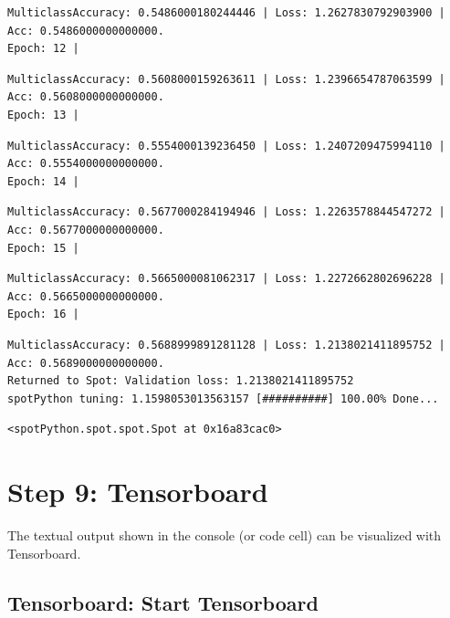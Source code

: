 \documentclass[
  letterpaper,
  DIV=11,
  numbers=noendperiod]{scrreprt}
\begin{document}
\begin{verbatim}
MulticlassAccuracy: 0.5486000180244446 | Loss: 1.2627830792903900 | Acc: 0.5486000000000000.
Epoch: 12 | 
\end{verbatim}

\begin{verbatim}
MulticlassAccuracy: 0.5608000159263611 | Loss: 1.2396654787063599 | Acc: 0.5608000000000000.
Epoch: 13 | 
\end{verbatim}

\begin{verbatim}
MulticlassAccuracy: 0.5554000139236450 | Loss: 1.2407209475994110 | Acc: 0.5554000000000000.
Epoch: 14 | 
\end{verbatim}

\begin{verbatim}
MulticlassAccuracy: 0.5677000284194946 | Loss: 1.2263578844547272 | Acc: 0.5677000000000000.
Epoch: 15 | 
\end{verbatim}

\begin{verbatim}
MulticlassAccuracy: 0.5665000081062317 | Loss: 1.2272662802696228 | Acc: 0.5665000000000000.
Epoch: 16 | 
\end{verbatim}

\begin{verbatim}
MulticlassAccuracy: 0.5688999891281128 | Loss: 1.2138021411895752 | Acc: 0.5689000000000000.
Returned to Spot: Validation loss: 1.2138021411895752
spotPython tuning: 1.1598053013563157 [##########] 100.00% Done...
\end{verbatim}

\begin{verbatim}
<spotPython.spot.spot.Spot at 0x16a83cac0>
\end{verbatim}

\hypertarget{sec-tensorboard-14}{%
\section{Step 9: Tensorboard}\label{sec-tensorboard-14}}

The textual output shown in the console (or code cell) can be visualized
with Tensorboard.

\hypertarget{tensorboard-start-tensorboard}{%
\subsection{Tensorboard: Start
Tensorboard}\label{tensorboard-start-tensorboard}}
\end{document}
